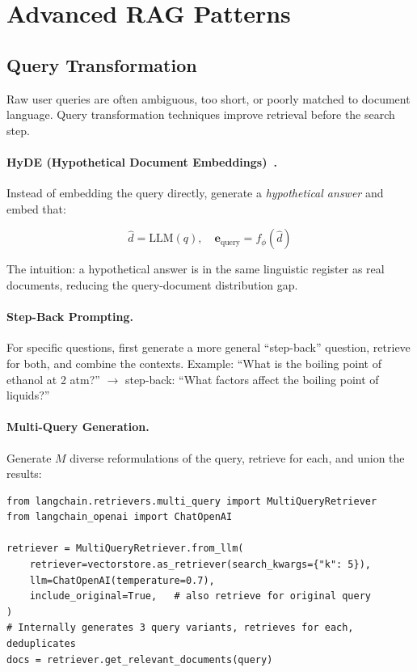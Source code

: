 \section{Advanced RAG Patterns}
\label{advanced-rag-patterns}

\subsection{Query Transformation}
\label{query-transformation}

Raw user queries are often ambiguous, too short, or poorly matched to document language. Query transformation techniques improve retrieval before the search step.

\paragraph{HyDE (Hypothetical Document Embeddings)~\cite{gao2022precise}.}
\label{hyde-hypothetical-document-embeddings-.}

Instead of embedding the query directly, generate a \emph{hypothetical answer} and embed that:

\begin{equation}
  \hat{d} = \text{LLM}(q), \quad \mathbf{e}_{\text{query}} = f_\phi(\hat{d})
\end{equation}

The intuition: a hypothetical answer is in the same linguistic register as real documents, reducing the query-document distribution gap.

\paragraph{Step-Back Prompting.}
\label{step-back-prompting.}

For specific questions, first generate a more general ``step-back'' question, retrieve for both, and combine the contexts. Example: ``What is the boiling point of ethanol at 2 atm?'' $\to$ step-back: ``What factors affect the boiling point of liquids?''

\paragraph{Multi-Query Generation.}
\label{multi-query-generation.}

Generate $M$ diverse reformulations of the query, retrieve for each, and union the results:

\begin{lstlisting}[style=pythonstyle, caption={Multi-query retrieval}]
from langchain.retrievers.multi_query import MultiQueryRetriever
from langchain_openai import ChatOpenAI

retriever = MultiQueryRetriever.from_llm(
    retriever=vectorstore.as_retriever(search_kwargs={"k": 5}),
    llm=ChatOpenAI(temperature=0.7),
    include_original=True,   # also retrieve for original query
)
# Internally generates 3 query variants, retrieves for each, deduplicates
docs = retriever.get_relevant_documents(query)
\end{lstlisting}

